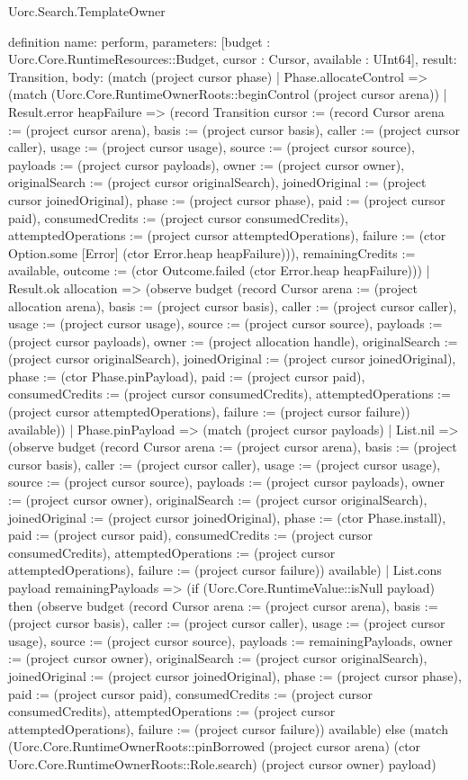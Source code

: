 \begin{lexlean}{Uorc.Search.TemplateOwner}
\begin{semanticmodule}
definition{
  name: perform,
  parameters: [budget : Uorc.Core.RuntimeResources::Budget, cursor : Cursor, available : UInt64],
  result: Transition,
  body: (match (project cursor phase)
    | Phase.allocateControl => (match (Uorc.Core.RuntimeOwnerRoots::beginControl (project cursor arena))
      | Result.error heapFailure => (record Transition {cursor := (record Cursor {arena := (project cursor arena), basis := (project cursor basis), caller := (project cursor caller), usage := (project cursor usage), source := (project cursor source), payloads := (project cursor payloads), owner := (project cursor owner), originalSearch := (project cursor originalSearch), joinedOriginal := (project cursor joinedOriginal), phase := (project cursor phase), paid := (project cursor paid), consumedCredits := (project cursor consumedCredits), attemptedOperations := (project cursor attemptedOperations), failure := (ctor Option.some [Error] (ctor Error.heap heapFailure))}), remainingCredits := available, outcome := (ctor Outcome.failed (ctor Error.heap heapFailure))})
      | Result.ok allocation => (observe budget (record Cursor {arena := (project allocation arena), basis := (project cursor basis), caller := (project cursor caller), usage := (project cursor usage), source := (project cursor source), payloads := (project cursor payloads), owner := (project allocation handle), originalSearch := (project cursor originalSearch), joinedOriginal := (project cursor joinedOriginal), phase := (ctor Phase.pinPayload), paid := (project cursor paid), consumedCredits := (project cursor consumedCredits), attemptedOperations := (project cursor attemptedOperations), failure := (project cursor failure)}) available))
    | Phase.pinPayload => (match (project cursor payloads)
      | List.nil => (observe budget (record Cursor {arena := (project cursor arena), basis := (project cursor basis), caller := (project cursor caller), usage := (project cursor usage), source := (project cursor source), payloads := (project cursor payloads), owner := (project cursor owner), originalSearch := (project cursor originalSearch), joinedOriginal := (project cursor joinedOriginal), phase := (ctor Phase.install), paid := (project cursor paid), consumedCredits := (project cursor consumedCredits), attemptedOperations := (project cursor attemptedOperations), failure := (project cursor failure)}) available)
      | List.cons payload remainingPayloads => (if (Uorc.Core.RuntimeValue::isNull payload) then (observe budget (record Cursor {arena := (project cursor arena), basis := (project cursor basis), caller := (project cursor caller), usage := (project cursor usage), source := (project cursor source), payloads := remainingPayloads, owner := (project cursor owner), originalSearch := (project cursor originalSearch), joinedOriginal := (project cursor joinedOriginal), phase := (project cursor phase), paid := (project cursor paid), consumedCredits := (project cursor consumedCredits), attemptedOperations := (project cursor attemptedOperations), failure := (project cursor failure)}) available) else (match (Uorc.Core.RuntimeOwnerRoots::pinBorrowed (project cursor arena) (ctor Uorc.Core.RuntimeOwnerRoots::Role.search) (project cursor owner) payload)
}
\end{semanticmodule}
\end{lexlean}
